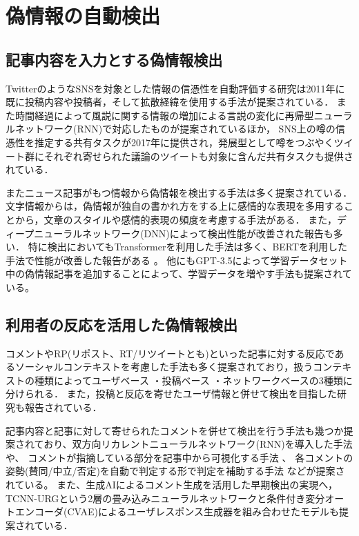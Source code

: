 \section{偽情報の自動検出}
\subsection{記事内容を入力とする偽情報検出}
TwitterのようなSNSを対象とした情報の信憑性を自動評価する研究は2011年に既に投稿内容や投稿者，そして拡散経緯を使用する手法が提案されている\cite{10.1145/1963405.1963500}．
また時間経過によって風説に関する情報の増加による言説の変化に再帰型ニューラルネットワーク(RNN)で対応したものが提案されている\cite{10.5555/3061053.3061153}ほか，
SNS上の噂の信憑性を推定する共有タスクが2017年に提供され\cite{derczynski-etal-2017-semeval}，発展型として噂をつぶやくツイート群にそれぞれ寄せられた議論のツイートも対象に含んだ共有タスクも提供されている\cite{gorrell-etal-2019-semeval}．

またニュース記事がもつ情報から偽情報を検出する手法は多く提案されている．
文字情報からは，偽情報が独自の書かれ方をする上に感情的な表現を多用することから，文章のスタイル\cite{potthast-etal-2018-stylometric}や感情的表現の頻度\cite{DBLP:journals/corr/abs-1903-01728}を考慮する手法がある．
また，ディープニューラルネットワーク(DNN)によって検出性能が改善された報告\cite{wang-2017-liar,karimi-tang-2019-learning,karimi-etal-2018-multi}も多い．
特に検出においてもTransformerを利用した手法は多く、BERTを利用した手法で性能が改善した報告がある \cite{Kaliyar2021,yanagi2021classifying}。
他にもGPT-3.5によって学習データセット中の偽情報記事を追加することによって、学習データを増やす手法も提案されている\cite{lucas-etal-2023-fighting}。

\subsection{利用者の反応を活用した偽情報検出}
コメントやRP(リポスト、RT/リツイートとも)といった記事に対する反応であるソーシャルコンテキストを考慮した手法も多く提案されており，扱うコンテキストの種類によってユーザベース\cite{Castillo:2011:ICT:1963405.1963500,8397048,DBLP:journals/corr/abs-1904-13355}
・投稿ベース\cite{Yang_Shu_Wang_Gu_Wu_Liu_2019,Tacchini2017SomeLI,Jin:2016:NVE:3016100.3016318}
・ネットワークベース\cite{Wu:2018:TFF:3159652.3159677,DBLP:journals/corr/abs-1902-06673}の3種類に分けられる．
また，投稿と反応を寄せたユーザ情報と併せて検出を目指した研究も報告されている\cite{10.1145/3386253}．

記事内容と記事に対して寄せられたコメントを併せて検出を行う手法も幾つか提案されており、双方向リカレントニューラルネットワーク(RNN)を導入した手法や\cite{https://doi.org/10.1049/ise2.12021}、
コメントが指摘している部分を記事中から可視化する手法 \cite{10.1145/3292500.3330935}、
各コメントの姿勢(賛同/中立/否定)を自動で判定する形で判定を補助する手法 \cite{9414787} などが提案されている。
また、生成AIによるコメント生成を活用した早期検出の実現へ，TCNN-URGという2層の畳み込みニューラルネットワークと条件付き変分オートエンコーダ(CVAE)によるユーザレスポンス生成器を組み合わせたモデルも提案されている\cite{ijcai2018-533}．

